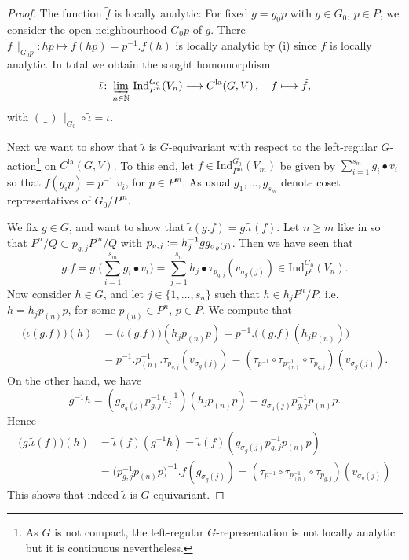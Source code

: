 \documentclass[a4paper, reqno, 10pt]{amsart}
\theoremstyle{definition}
\numberwithin{equation}{section}
\newcommand{\blank}{{\,\_\,}}
\newcommand{\defeq}{\vcentcolon=}
\newcommand{\Ind}{{\mathrm{Ind}}}
\newcommand{\la}{{\mathrm{la}}}
\newcommand{\lra}{\longrightarrow}
\newcommand{\lto}{\longmapsto}
\newcommand{\mto}{\mapsto}
\newcommand{\res}[1]{{\!\,\mid_{#1}}}
\newcommand{\BN}{{\mathbb {N}}}
\begin{document}
\begin{proof}
	
	The function $\tilde{f}$ is locally analytic:
	For fixed $g=g_0 p$ with $g\in G_0$, $p\in P$, we consider the open neighbourhood $G_0 p$ of $g$.
	There $\tilde{f}\res{G_0  p} \colon h  p \mto \tilde{f}(hp) = p^{-1}.f(h)$ is locally analytic by  (i) since $f$ is locally analytic.
	In total we obtain the sought homomorphism
	\begin{equation*}
		\tilde{\iota} \colon \varinjlim_{n\in\BN}\, \Ind^{G_0}_{P^n} (V_n) \lra C^\la(G,V) \,,\quad f \lto \tilde{f} ,
	\end{equation*}
	with $(\blank)\res{G_0} \circ \tilde{\iota} = \iota$.
	
	
	Next we want to show that $\tilde{\iota}$ is $G$-equivariant with respect to the left-regular $G$-action\footnote{As $G$ is not compact, the left-regular $G$-representation is not locally analytic but it is continuous nevertheless.} on $C^\la(G,V)$.
	To this end, let $f \in \Ind^{G_0}_{P^m}(V_m)$ be given by $\sum_{i=1}^{s_m} g_i \bullet v_i$ so that $f(g_i p ) = p^{-1}. v_i$, for $p\in P^m$.
	As usual $g_1,\ldots,g_{s_m}$ denote coset representatives of $G_0/P^m$.
	
	
	We fix $g\in G$, and want to show that $\tilde{\iota}(g.f) = g. \tilde{\iota}(f)$.
	Let $n\geq m$ like in  so that $P^n/Q \subset p_{g,j} P^m/Q$ with $p_{g,j} \defeq h_j^{-1} g g_{\sigma_g(j)}$.
	Then we have seen that 
	\begin{equation*}
		g.f = g.\bigg( \sum_{i=1}^{s_m}  g_i \bullet v_i \bigg) = \sum_{j=1}^{s_n}  h_j \bullet \tau_{p_{g,j}} (v_{\sigma_g(j)}) \in  \Ind^{G_0}_{P^n} (V_n).
	\end{equation*}
	Now consider $h\in G$, and let $j\in \{1,\ldots, s_n\}$ such that $h \in h_j P^n/P$, i.e.\ $h = h_j p_{(n)} p$, for some $p_{(n)} \in P^n$, $p\in P$.
	We compute that
	\begin{align*}
		\big( \tilde{\iota}(g.f)\big) (h) &= \big( \tilde{\iota}(g.f)\big) (h_j p_{(n)} p)
		= p^{-1}. \big( (g.f)(h_j p_{(n)}) \big) \\
		&= p^{-1}. p_{(n)}^{-1}. \tau_{p_{g,j}} (v_{\sigma_g(j)})
		= (\tau_{p^{-1}} \circ \tau_{p_{(n)}^{-1}} \circ \tau_{p_{g,j}})(v_{\sigma_g(j)}) .
	\end{align*}
	On the other hand, we have
	\begin{equation*}
		g^{-1} h = (g_{\sigma_g(j)} p_{g,j}^{-1} h_j^{-1} ) ( h_j p_{(n)} p) = g_{\sigma_g(j)} p^{-1}_{g,j} p_{(n)} p .
	\end{equation*}
	Hence
	\begin{align*}
		\big(g.\tilde{\iota}(f)\big)(h) &= \tilde{\iota}(f)(g^{-1}h) 
		= \tilde{\iota}(f)(g_{\sigma_g(j)} p^{-1}_{g,j} p_{(n)} p )\\
		&= \big(p_{g,j}^{-1} p_{(n)} p \big)^{-1} . f( g_{\sigma_g(j)}) 
		= (\tau_{p^{-1}} \circ \tau_{p_{(n)}^{-1}} \circ \tau_{p_{g,j}} ) (v_{\sigma_g(j)})
	\end{align*}
	This shows that indeed $\tilde{\iota}$ is $G$-equivariant.
	

\end{proof}
\end{document}
